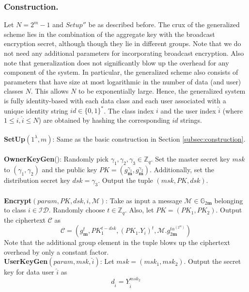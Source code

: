 \subsubsection{Construction.} Let $N=2^m-1$ and $Setup''$ be as described before. The crux of the generalized scheme lies in the combination of the aggregate key with the broadcast encryption secret, although though they lie in different groups. Note that we do not need any additional parameters for incorporating broadcast encryption. Also note that generalization does not significantly blow up the overhead for any component of the system. In particular, the generalized scheme also consists of parameters that have size at most logarithmic in the number of data (and user) classes $N$. This allows $N$ to be exponentially large. Hence, the generalized system is fully identity-based with each data class and each user associated with a unique identity string $id\in\{0,1\}^{*}$. The class index $i$ and the user index $\hat{i}$ (where $1\leq i,\hat{i} \leq N$) are obtained by hashing the corresponding $id$ strings.\\\\
% 
\noindent\textbf{SetUp}$(1^{\lambda},m)$: Same as the basic construction in Section \ref{subsec:construction}.\\\\
% 
\noindent\textbf{OwnerKeyGen}(): Randomly pick $\gamma_1, \gamma_2, \gamma_3 \in \mathbb{Z}_q$. Set the master secret key $msk$ to $(\gamma_1,\gamma_2)$ and the public key $PK=(g^{\gamma_1}_{\mathbf{m}},g^{\gamma_2}_{\mathbf{m}})$. Additionally, set the distribution secret key $dsk=\gamma_3$. Output the tuple $(msk,PK,dsk)$.\\\\
% 
\noindent\textbf{Encrypt}$(param,PK,dsk,i,\mathcal{M})$: Take as input a message $\mathcal{M} \in \mathbb{G}_{2\mathbf{m}}$ belonging to class $i \in \mathcal{ID}$. Randomly choose $t\in\mathbb{Z}_q$. Also, let $PK=(PK_1,PK_2)$. Output the ciphertext $\mathcal{C}$ as 
\begin{equation}
 \mathcal{C}=\left(g^{t}_{\mathbf{m}},PK^{t-dsk}_1,(PK_1.Y_i)^{t},\mathcal{M}.g^{t\alpha^{(2^m)}}_{2\mathbf{m}}\right)\nonumber
\end{equation}
\noindent Note that the additional group element in the tuple blows up the ciphertext overhead by only a constant factor.\\

\noindent\textbf{UserKeyGen}$(param,msk,\hat{i})$: Let $msk=(msk_1,msk_2)$. Output the secret key for data user $\hat{i}$ as \begin{equation}
 d_{\hat{i}}=Y^{msk_2}_{\hat{i}}\nonumber
\end{equation}

